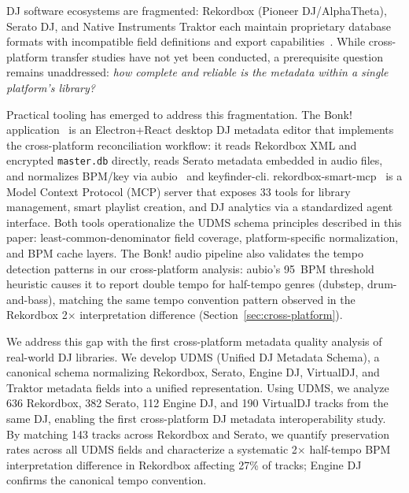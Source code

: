 \documentclass[letterpaper,10pt]{article}
\let\citep\cite  %
\begin{document}
DJ software ecosystems are fragmented: Rekordbox (Pioneer DJ/AlphaTheta), Serato DJ, and Native Instruments Traktor each maintain proprietary database formats with incompatible field definitions and export capabilities~\citep{pyrekordbox,serato-parser}. While cross-platform transfer studies have not yet been conducted, a prerequisite question remains unaddressed: \emph{how complete and reliable is the metadata within a single platform's library?}

Practical tooling has emerged to address this fragmentation. The Bonk! application~\citep{bonk-app} is an Electron+React desktop DJ metadata editor that implements the cross-platform reconciliation workflow: it reads Rekordbox XML and encrypted \texttt{master.db} directly, reads Serato metadata embedded in audio files, and normalizes BPM/key via aubio~\citep{brossier2010aubio} and keyfinder-cli. rekordbox-smart-mcp~\citep{rekordbox-smart-mcp} is a Model Context Protocol (MCP) server that exposes 33 tools for library management, smart playlist creation, and DJ analytics via a standardized agent interface. Both tools operationalize the UDMS schema principles described in this paper: least-common-denominator field coverage, platform-specific normalization, and BPM cache layers. The Bonk! audio pipeline also validates the tempo detection patterns in our cross-platform analysis: aubio's 95~BPM threshold heuristic causes it to report double tempo for half-tempo genres (dubstep, drum-and-bass), matching the same tempo convention pattern observed in the Rekordbox 2$\times$ interpretation difference (Section~\ref{sec:cross-platform}).

We address this gap with the first cross-platform metadata quality analysis of real-world DJ libraries. We develop UDMS (Unified DJ Metadata Schema), a canonical schema normalizing Rekordbox, Serato, Engine DJ, VirtualDJ, and Traktor metadata fields into a unified representation.  Using UDMS, we analyze 636 Rekordbox, 382 Serato, 112 Engine DJ, and 190 VirtualDJ tracks from the same DJ, enabling the first cross-platform DJ metadata interoperability study. By matching 143 tracks across Rekordbox and Serato, we quantify preservation rates across all UDMS fields and characterize a systematic 2$\times$ half-tempo BPM interpretation difference in Rekordbox affecting 27\% of tracks; Engine DJ confirms the canonical tempo convention.
\end{document}
